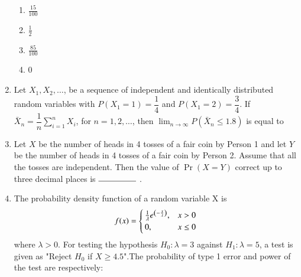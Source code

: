 \documentclass[journal,12pt,twocolumn]{IEEEtran}
\begin{document}
\begin{enumerate}
\begin{enumerate}[label=(\Alph*)]
    \item $\frac{15}{100}$ \\
    \item $\frac{1}{2}$ \\
    \item $\frac{85}{100}$ \\
    \item 0 
  \end{enumerate}
  \solution
  
  \item Let $X_{1},X_{2},\dots$, be a sequence of independent and identically distributed random variables with $P(X_{1}=1)=\dfrac{1}{4}$ and $P(X_{1}=2)=\dfrac{3}{4}$. If $\bar X_{n}=\dfrac{1}{n}\displaystyle\sum_{i=1}^{n}X_{i}$,  for $n=1,2,\dots$, then $\displaystyle\lim_{n\to\infty}P(\bar X_{n} \leq 1.8)$ is equal to
  \\
  \solution
  
  \item Let $X$ be the number of heads in 4 tosses of a fair coin by Person 1 and let $Y$ be the number of heads in 4 tosses of a fair coin by Person 2. Assume that all the tosses are independent. Then the value of $\Pr{(X=Y)}$ correct up to three decimal places is $\rule{1.6cm}{0.15mm}$ .
%
  \solution
  
\item The probability density function of a random variable X is
\begin{equation}
f(x)=
\begin{cases}
\frac{1}{\lambda}e^{\left(-\frac{x}{\lambda}\right)}, & x>0\\
0, & x\leq 0
\end{cases}
\end{equation}
where $\lambda>0.$ For testing the hypothesis $H_{0}:\lambda=3$ against $H_{1}:\lambda=5$, a test is given as "Reject $H_0$ if $X\geq 4.5$".The probability of type 1 error and power of the test are respectively: 
\begin{enumerate}

\end{enumerate}
\end{enumerate}
\end{document}
